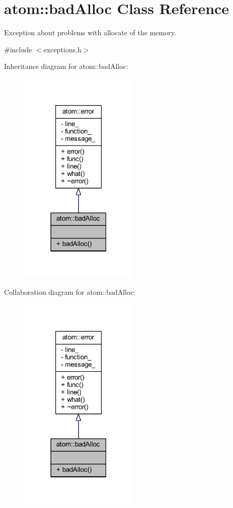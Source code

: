 \hypertarget{classatom_1_1bad_alloc}{}\section{atom\+:\+:bad\+Alloc Class Reference}
\label{classatom_1_1bad_alloc}


Exception about problems with allocate of the memory.  




{\ttfamily \#include $<$exceptions.\+h$>$}



Inheritance diagram for atom\+:\+:bad\+Alloc\+:
\nopagebreak
\begin{figure}[H]
\begin{center}
\leavevmode
\includegraphics[width=162pt]{classatom_1_1bad_alloc__inherit__graph}
\end{center}
\end{figure}


Collaboration diagram for atom\+:\+:bad\+Alloc\+:
\nopagebreak
\begin{figure}[H]
\begin{center}
\leavevmode
\includegraphics[width=162pt]{classatom_1_1bad_alloc__coll__graph}
\end{center}
\end{figure}
